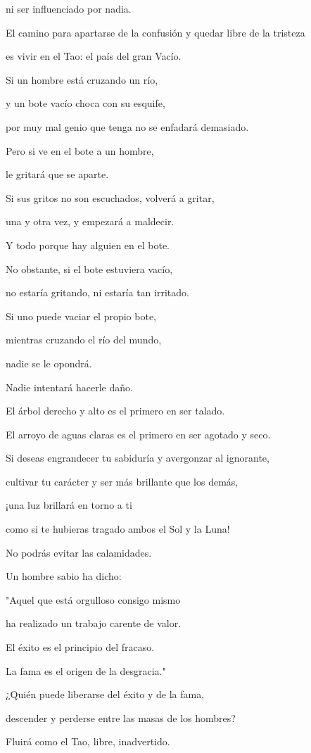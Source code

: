 ni ser influenciado por nadia.

El camino para apartarse de la confusión y quedar libre de la tristeza

es vivir en el Tao: el país del gran Vacío.

Si un hombre está cruzando un río,

y un bote vacío choca con su esquife,

por muy mal genio que tenga no se enfadará demasiado.

Pero si ve en el bote a un hombre,

le gritará que se aparte.

Si sus gritos no son escuchados, volverá a gritar,

una y otra vez, y empezará a maldecir.

Y todo porque hay alguien en el bote.

No obstante, si el bote estuviera vacío,

no estaría gritando, ni estaría tan irritado.

Si uno puede vaciar el propio bote,

mientras cruzando el río del mundo,

nadie se le opondrá.

Nadie intentará hacerle daño.

El árbol derecho y alto es el primero en ser talado.

El arroyo de aguas claras es el primero en ser agotado y seco.

Si deseas engrandecer tu sabiduría y avergonzar al ignorante,

cultivar tu carácter y ser más brillante que los demás,

¡una luz brillará en torno a ti

como si te hubieras tragado ambos el Sol y la Luna!

No podrás evitar las calamidades.

Un hombre sabio ha dicho:

"Aquel que está orgulloso consigo mismo

ha realizado un trabajo carente de valor.

El éxito es el principio del fracaso.

La fama es el origen de la desgracia."

¿Quién puede liberarse del éxito y de la fama,

descender y perderse entre las masas de los hombres?

Fluirá como el Tao, libre, inadvertido.

